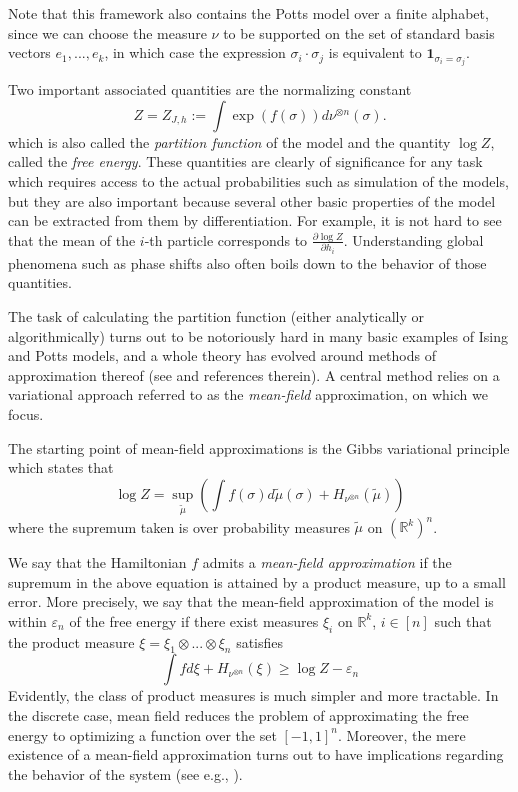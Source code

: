 \documentclass[12pt]{article}
\def \RR {\mathbb R}
\def \eps {\varepsilon}
\theoremstyle{definition}
\theoremstyle{remark}
\begin{document}
Note that this framework also contains the Potts model over a finite alphabet, since we can choose the measure $\nu$ to be supported on the set of standard basis vectors $e_1,...,e_k$, in which case the expression $\sigma_i \cdot \sigma_j$ is equivalent to $\mathbf{1}_{\sigma_i = \sigma_j}$.

Two important associated quantities are the normalizing constant 
$$
Z = Z_{J,h} := \int \exp(f(\sigma)) d \nu^{\otimes n} (\sigma).
$$
which is also called the \emph{partition function} of the model and the quantity $\log{Z}$, called the \emph{free energy}. These quantities are clearly of significance for any task which requires access to the actual probabilities such as simulation of the models, but they are also important because several other basic properties of the model can be extracted from them by differentiation. For example, it is not hard to see that the mean of the $i$-th particle corresponds to $\frac{\partial \log Z}{ \partial h_i}$. Understanding global phenomena such as phase shifts also often boils down to the behavior of those quantities.

The task of calculating the partition function (either analytically or algorithmically) turns out to be notoriously hard in many basic examples of Ising and Potts models, and a whole theory has evolved around methods of approximation thereof (see \cite{BM16} and references therein). A central method relies on a variational approach referred to as the \emph{mean-field} approximation, on which we focus.

The starting point of mean-field approximations is the Gibbs variational principle which states that
$$
\log Z = \sup_{\tilde \mu} \left ( \int f(\sigma) d \tilde \mu(\sigma) + H_{\nu^{\otimes n}} (\tilde \mu) \right )
$$
where the supremum taken is over probability measures $\tilde \mu$ on $(\RR^k)^n$.

We say that the Hamiltonian $f$ admits a \emph{mean-field approximation} if the supremum in the above equation is attained by a product measure, up to a small error. More precisely, we say that the mean-field approximation of the model is within $\eps_n$ of the free energy if there exist measures $\xi_i$ on $\RR^k$, $i \in [n]$ such that the product measure $\xi = \xi_1 \otimes ... \otimes \xi_n$ satisfies
$$
\int f d \xi + H_{\nu^{\otimes n}} (\xi) \geq \log Z - \eps_n
$$
Evidently, the class of product measures is much simpler and more tractable. In the discrete case, mean field reduces the problem of approximating the free energy to optimizing a function over the set $[-1,1]^n$. Moreover, the mere existence of a mean-field approximation turns out to have implications regarding the behavior of the system (see e.g., \cite{BM16}).\\
\end{document}
